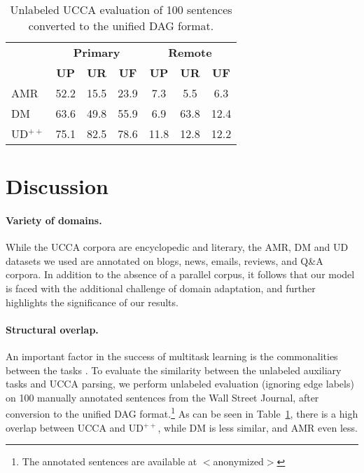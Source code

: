 \documentclass[11pt,a4paper]{article}
\begin{document}
\begin{table}
\begin{tabular}{l|ccc|ccc}
& \multicolumn{3}{c|}{\footnotesize \bf Primary} & \multicolumn{3}{c}{\footnotesize \bf Remote} \\
& \footnotesize \textbf{UP} & \footnotesize \textbf{UR} & \footnotesize \textbf{UF}
& \footnotesize \textbf{UP} & \footnotesize \textbf{UR} & \footnotesize \textbf{UF} \\
\hline
AMR & 52.2 & 15.5 & 23.9 & 7.3 & 5.5 & 6.3 \\
DM & 63.6 & 49.8 & 55.9 & 6.9 & 63.8 & 12.4 \\
UD$^{++}$ & 75.1 & 82.5 & 78.6 & 11.8 & 12.8 & 12.2
\end{tabular}
\caption{Unlabeled UCCA evaluation of 100 sentences converted to the unified DAG format.
\label{tab:common}}
\end{table}


\section{Discussion}\label{sec:discussion}

\paragraph{Variety of domains.}
While the UCCA corpora are encyclopedic and literary,
the AMR, DM and UD datasets we used are annotated on blogs, news, emails, reviews, and Q\&A corpora.
In addition to the absence of a parallel corpus,
it follows that our model is faced with the additional challenge of domain adaptation,
and further highlights the significance of our results.

\paragraph{Structural overlap.}
An important factor in the success of multitask learning is the commonalities between the tasks
\cite{E17-2026,E17-1005}.
To evaluate the similarity between the unlabeled auxiliary tasks and UCCA parsing,
we perform unlabeled evaluation (ignoring edge labels)
on 100 manually annotated sentences from the
Wall Street Journal, after conversion to the unified DAG format.\footnote{The annotated
sentences are available at $<$anonymized$>$}
As can be seen in Table~\ref{tab:common}, there is a high overlap between
UCCA and UD$^{++}$, while DM is less similar, and AMR even less.
\end{document}
